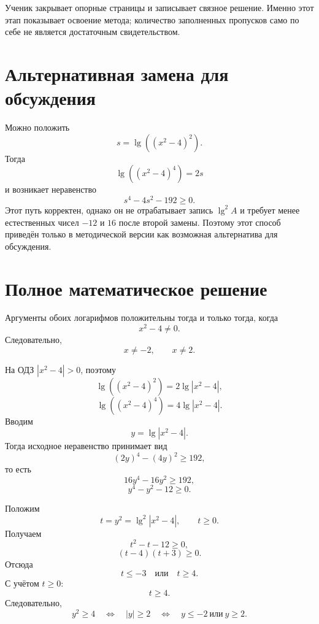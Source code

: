 \begin{teacherbox}
  Ученик закрывает опорные страницы и записывает связное решение. Именно этот
  этап показывает освоение метода; количество заполненных пропусков само по
  себе не является достаточным свидетельством.
\end{teacherbox}

\section{Альтернативная замена для обсуждения}

\begin{methodintro}
  Можно положить
  \[
    s=\lg((x^2-4)^2).
  \]
  Тогда
  \[
    \lg((x^2-4)^4)=2s
  \]
  и возникает неравенство
  \[
    s^4-4s^2-192\ge0.
  \]
  Этот путь корректен, однако он не отрабатывает запись \(\lg^2 A\) и
  требует менее естественных чисел \(-12\) и \(16\) после второй замены.
  Поэтому этот способ приведён только в методической версии как возможная
  альтернатива для обсуждения.
\end{methodintro}

\section{Полное математическое решение}


Аргументы обоих логарифмов положительны тогда и только тогда, когда
\[
  x^2-4\ne0.
\]
Следовательно,
\[
  x\ne-2,
  \qquad
  x\ne2.
\]


На ОДЗ \(|x^2-4|>0\), поэтому
\[
  \lg((x^2-4)^2)=2\lg|x^2-4|,
\]
\[
  \lg((x^2-4)^4)=4\lg|x^2-4|.
\]
Вводим
\[
  y=\lg|x^2-4|.
\]
Тогда исходное неравенство принимает вид
\[
  (2y)^4-(4y)^2\ge192,
\]
то есть
\[
  16y^4-16y^2\ge192,
\]
\[
  y^4-y^2-12\ge0.
\]


Положим
\[
  t=y^2=\lg^2|x^2-4|,
  \qquad t\ge0.
\]
Получаем
\[
  t^2-t-12\ge0,
\]
\[
  (t-4)(t+3)\ge0.
\]
Отсюда
\[
  t\le-3
  \quad\text{или}\quad
  t\ge4.
\]
С учётом \(t\ge0\):
\[
  t\ge4.
\]
Следовательно,
\[
  y^2\ge4
  \quad\Longleftrightarrow\quad
  |y|\ge2
  \quad\Longleftrightarrow\quad
  y\le-2\ \text{или}\ y\ge2.
\]

